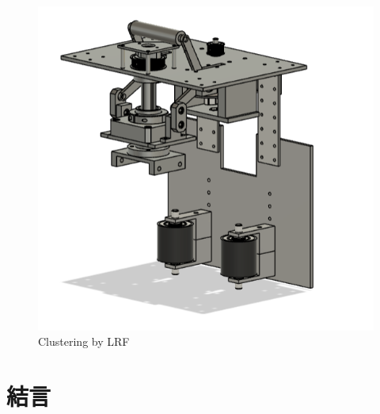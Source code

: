 \documentclass{classes/sice-si}
\begin{document}
\begin{figure}[H]
    \centering
    \begin{minipage}{0.7\linewidth}
        \centering
        \includegraphics[width=\linewidth]{figures/4.png}
        \caption{Clustering by LRF}
        \label{fig:new}
    \end{minipage}
    \hfill
    \vspace{0pt} %
\end{figure}



\section{結言}




\printbibliography[title=参考文献]
\end{document}
